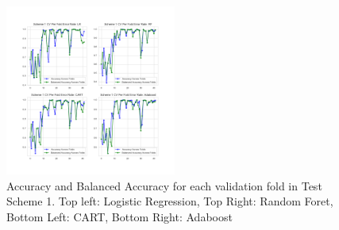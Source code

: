 \documentclass[11pt, letterpaper, journal]{IEEEtran}
\begin{document}
\begin{table}
\begin{center}
\caption{CV and test results for the 4 models under test scheme 1. "B.Acc" stands for balanced accuracy.}
\label{tab:scheme1_results}
\end{center}
\end{table}

\begin{table}
\begin{center}
\caption{CV and test set results for the 4 models under test scheme 2}
\label{tab:scheme2_results}
\end{center}
\end{table}

\begin{figure}[h]
\centering
\includegraphics[width=0.5\textwidth]{statics/test_Scheme_1_Fold_error.png}
\caption{Accuracy and Balanced Accuracy for each validation fold in Test Scheme 1. Top left: Logistic Regression, Top Right: Random Foret, Bottom Left: CART, Bottom Right: Adaboost}
\label{fig:fold_results_1}
\end{figure}
\end{document}
